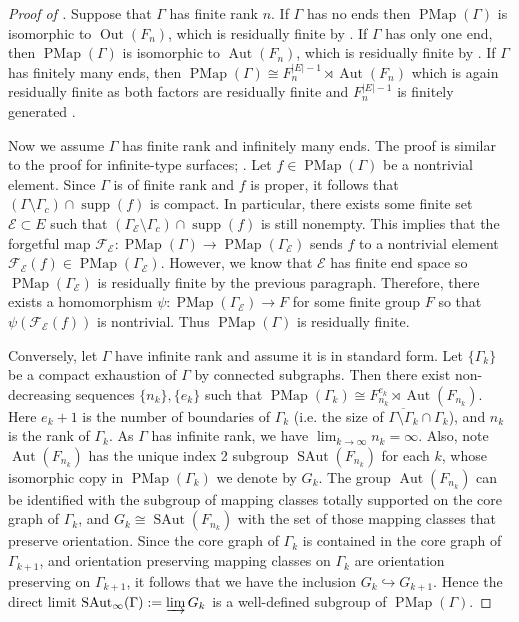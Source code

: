 \documentclass[11pt]{amsart}
\theoremstyle{plain}
\theoremstyle{definition}
\DeclareMathOperator{\Aut}{Aut}
\DeclareMathOperator{\SAut}{SAut}
\DeclareMathOperator{\Out}{Out}
\DeclareMathOperator{\PMap}{PMap}
\DeclareMathOperator{\supp}{supp}
\newcommand{\cE}{\mathcal{E}}
\newcommand{\cF}{\mathcal{F}}
\def\G{{\Gamma}}
\newcommand{\<}{\langle}
\renewcommand{\>}{\rangle}
\begin{document}
 \begin{proof}[Proof of ]
   Suppose that $\G$ has finite rank $n$. If $\G$ has no ends then $\PMap(\G)$ is isomorphic to $\Out(F_n)$, which is residually finite by \cite{grossman1974}. If $\G$ has only one end, then $\PMap(\G)$ is isomorphic to $\Aut(F_n)$, which is residually finite by \cite{baumslag1963}. If $\G$ has finitely many ends, then $\PMap(\G) \cong F_n^{{|E|-1}} \rtimes \Aut(F_n)$ which is again residually finite as both factors are residually finite and $F_n^{|E|-1}$ is finitely generated \cite[Theorem 1]{mal1958homomorphisms}.
   
   Now we assume $\G$ has finite rank and infinitely many ends. The proof is similar to the proof for infinite-type surfaces; \cite[Proposition 4.6]{PatelVlamis}. Let $f \in \PMap(\G)$ be a nontrivial element. Since $\G$ is of finite rank and $f$ is proper, it follows that $(\G \setminus \G_c) \cap \supp(f)$ is compact. In particular, there exists some finite set $\cE \subset E$ such that $(\G_\cE \setminus \G_c) \cap \supp(f)$ is still nonempty. This implies that the forgetful map $\cF_\cE: \PMap(\G) \to \PMap(\G_\cE)$ sends $f$ to a nontrivial element $\cF_\cE(f) \in \PMap(\G_\cE)$.
   However, we know that $\cE$ has finite end space so $\PMap(\G_\cE)$ is residually finite by the previous paragraph. Therefore, there exists a homomorphism $\psi: \PMap(\G_\cE) \to F$ for some finite group $F$ so that $\psi(\cF_\cE(f))$ is nontrivial. Thus $\PMap(\G)$ is residually finite.

   Conversely, let $\G$ have infinite rank and assume it is in standard form.
   Let $\{\G_{k}\}$ be a compact exhaustion of $\G$ by connected subgraphs. Then there exist non-decreasing sequences $\{n_k\}, \{e_k\}$ such that $\PMap(\G_k) \cong F_{n_k}^{e_k} \rtimes \Aut(F_{n_k})$. Here $e_k+1$ is the number of boundaries of $\G_k$ (i.e. the size of $\overline{\G \setminus \G_k} \cap \G_k$), and $n_k$ is the rank of $\G_k$. As $\G$ has infinite rank, we have $\lim_{k \to \infty}n_k = \infty.$ Also, note $\Aut(F_{n_k})$ has the unique index 2 subgroup $\SAut(F_{n_k})$ for each $k$, whose isomorphic copy in $\PMap(\G_k)$ we denote by $G_k$. The group $\Aut(F_{n_k})$ can be identified with the subgroup of mapping classes totally supported on the core graph of $\G_k$, and $G_{k} \cong \SAut(F_{n_{k}})$ with the set of those mapping classes that preserve orientation. Since the core graph of $\G_{k}$ is contained in the core graph of $\G_{k+1}$, and orientation preserving mapping classes on $\G_k$ are orientation preserving on $\G_{k+1}$, it follows that we have the inclusion $G_k \hookrightarrow G_{k+1}$. Hence the direct limit $\SAut_\infty(\G) := \varinjlim G_k$ is a well-defined subgroup of $\PMap(\G)$.
   

\end{proof}
\end{document}
